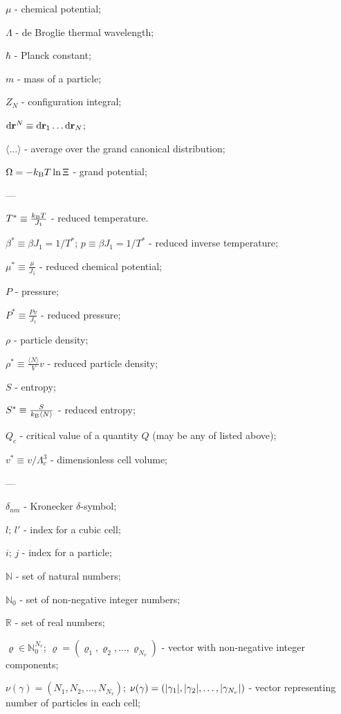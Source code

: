 $\mu$ - chemical potential;

$\Lambda$ - de Broglie thermal wavelength;

$\hbar$ - Planck constant;

$m$ - mass of a particle;

$Z_N$ - configuration integral;

${\rm d} \vb{r}^N \equiv {\rm d}{\vb r_1} \dotsc {\rm d}{\vb r_N}$;

$\langle\ldots\rangle$ - average over the grand canonical distribution;

$\Omega = -k_{\rm B}T \ln \Xi$ - grand potential;

---

$T^* \equiv \frac{k_{\rm B}T}{J_1}$ - reduced temperature.

$\beta^* \equiv \beta J_1 = 1/T^*$; $p \equiv \beta J_1 = 1/T^*$ - reduced inverse temperature;

$\mu^* \equiv \frac{\mu}{J_1}$ - reduced chemical potential;

$P$ - pressure;

$P^* \equiv \frac{Pv}{J_1}$ - reduced pressure;

$\rho$ - particle density;

$\rho^* \equiv \frac{\langle N \rangle}{V}v$ - reduced particle density;

$S$ - entropy;

$S^* \equiv \frac{S}{k_{\rm B} \langle N \rangle}$ - reduced entropy;

$Q_c$ - critical value of a quantity $Q$ (may be any of listed above);

$v^* \equiv {v}/{\Lambda_c^3}$ - dimensionless cell volume;

---

$\delta_{nm}$ - Kronecker $\delta$-symbol;

$l$; $l'$ - index for a cubic cell;

$i$; $j$ - index for a particle;

$\mathbb{N}$ - set of natural numbers;

$\mathbb{N}_0$ - set of non-negative integer numbers;

$\mathbb{R}$ - set of real numbers;

$\varrho \in \mathbb{N}_0^{N_v}$; $\varrho = (\varrho_1, \varrho_2, \ldots, \varrho_{N_{v}})$ - vector with non-negative integer components;

$\nu(\gamma)=(N_1, N_2, \ldots, N_{N_v})$; $\nu(\gamma) = (\abs{\gamma_1}, \abs{\gamma_2}, \ldots, \abs{\gamma_{N_v}})$ - vector representing number of particles in each cell;

